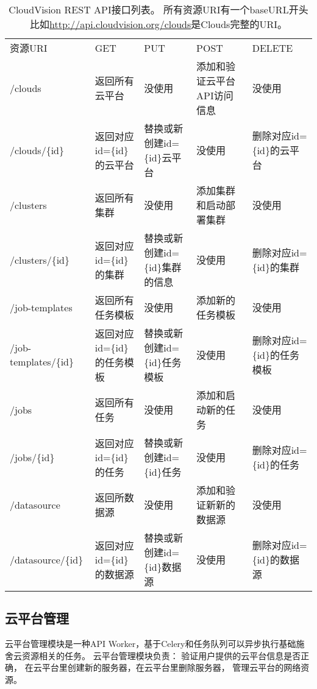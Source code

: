 \begin{table}[H]
  \centering
  \begin{minipage}[t]{0.98\linewidth} %
  \caption[CloudVision API接口列表]{CloudVision REST API接口列表。
    所有资源URI有一个baseURL开头比如\url{http://api.cloudvision.org/clouds}是Clouds完整的URI。}
  \label{tab:cloudvision-api}
    \begin{tabularx}{\linewidth}{lXXXX}
      \toprule[1.5pt]
        资源URI & GET & PUT & POST & DELETE \\
        /clouds & 返回所有云平台 & 没使用 & 添加和验证云平台API访问信息 & 没使用 \\
        /clouds/\{id\} & 返回对应id=\{id\}的云平台 & 替换或新创建id=\{id\}云平台 &  没使用 & 删除对应id=\{id\}的云平台 \\
        /clusters & 返回所有集群 & 没使用 & 添加集群和启动部署集群 & 没使用 \\
        /clusters/\{id\} & 返回对应id=\{id\}的集群 & 替换或新创建id=\{id\}集群的信息 &  没使用 & 删除对应id=\{id\}的集群 \\
        /job-templates & 返回所有任务模板 & 没使用 & 添加新的任务模板 & 没使用 \\
        /job-templates/\{id\} & 返回对应id=\{id\}的任务模板 & 替换或新创建id=\{id\}任务模板 &  没使用 & 删除对应id=\{id\}的任务模板 \\
        /jobs & 返回所有任务 & 没使用 & 添加和启动新的任务 & 没使用 \\
        /jobs/\{id\} & 返回对应id=\{id\}的任务 & 替换或新创建id=\{id\}任务 &  没使用 & 删除对应id=\{id\}的任务 \\
        /datasource & 返回所数据源 & 没使用 & 添加和验证新新的数据源 & 没使用 \\
        /datasource/\{id\} & 返回对应id=\{id\}的数据源 & 替换或新创建id=\{id\}数据源 &  没使用 & 删除对应id=\{id\}的数据源 \\
      \bottomrule[1.5pt]
    \end{tabularx}
  \end{minipage}
\end{table}


\subsection{云平台管理}
\label{subsec:api-worker-cloud}
云平台管理模块是一种API Worker，基于Celery和任务队列可以异步执行基础施舍云资源相关的任务。
云平台管理模块负责： 验证用户提供的云平台信息是否正确，
在云平台里创建新的服务器，在云平台里删除服务器，
管理云平台的网络资源。

